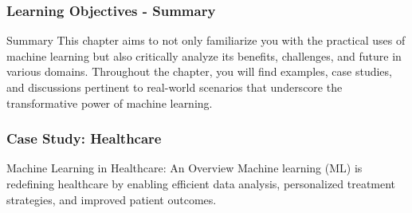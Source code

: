\documentclass{beamer}
\begin{document}
\begin{frame}[fragile]
    \frametitle{Learning Objectives - Summary}
    \begin{block}{Summary}
        This chapter aims to not only familiarize you with the practical uses of machine learning but also critically analyze its benefits, challenges, and future in various domains. 
        Throughout the chapter, you will find examples, case studies, and discussions pertinent to real-world scenarios that underscore the transformative power of machine learning.
    \end{block}
\end{frame}

\begin{frame}[fragile]
    \frametitle{Case Study: Healthcare}
    \begin{block}{Machine Learning in Healthcare: An Overview}
        Machine learning (ML) is redefining healthcare by enabling efficient data analysis, personalized treatment strategies, and improved patient outcomes.
    \end{block}
\end{frame}
\end{document}
